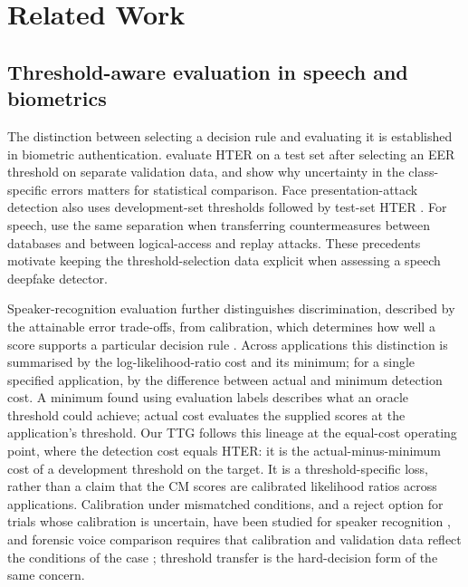 \section{Related Work}
\label{sec:related}

\subsection{Threshold-aware evaluation in speech and biometrics}
The distinction between selecting a decision rule and evaluating it is established in biometric authentication.
\citet{bengio04_hter} evaluate HTER on a test set after selecting an EER threshold on separate validation data, and
show why uncertainty in the class-specific errors matters for statistical comparison. Face presentation-attack
detection also uses development-set thresholds followed by test-set HTER \citep{chingovska12_lbp}.
For speech, \citet{korshunov16_crossdb} use the same separation when transferring countermeasures between databases
and between logical-access and replay attacks. These precedents motivate keeping the threshold-selection data
explicit when assessing a speech deepfake detector.

Speaker-recognition evaluation further distinguishes discrimination, described by the attainable error trade-offs,
from calibration, which determines how well a score supports a particular decision rule
\citep{brummer06_calibration,vanleeuwen07_intro}. Across applications this distinction is summarised by the
log-likelihood-ratio cost and its minimum; for a single specified application, by the difference between actual and
minimum detection cost. A minimum found using evaluation labels describes what an oracle threshold could achieve; actual
cost evaluates the supplied scores at the application's threshold. Our TTG follows this lineage at the equal-cost
operating point, where the detection cost equals HTER: it is the actual-minus-minimum cost of a development threshold
on the target. It is a threshold-specific loss, rather than a claim that the CM scores are calibrated likelihood
ratios across applications. Calibration under mismatched conditions, and a reject option for trials whose
calibration is uncertain, have been studied for speaker recognition \citep{ferrer19_failsafe}, and forensic voice
comparison requires that calibration and validation data reflect the conditions of the case
\citep{morrison13_tutorial,morrison21_consensus}; threshold transfer is the hard-decision form of the same concern.

